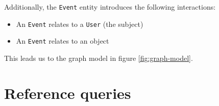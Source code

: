 Additionally, the \texttt{Event} entity introduces the following interactions:

\begin{itemize}
  \item An \texttt{Event} relates to a \texttt{User} (the subject)
  \item An \texttt{Event} relates to an object
\end{itemize}

This leads us to the graph model in figure \ref{fig:graph-model}.

\section{Reference queries}
\label{sec:reference-queries}


